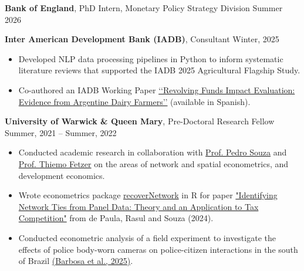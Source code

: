 \documentclass[letterpaper, 11pt]{article}
\begin{document}
\noindent
\textbf{Bank of England}, PhD Intern, Monetary Policy Strategy Division \hfill Summer 2026

\vspace{0.1cm}

\noindent
\textbf{Inter American Development Bank (IADB)},  Consultant \hfill Winter, 2025
\vspace{-0.2cm}
\begin{itemize}
	\item Developed NLP data processing pipelines in Python to inform systematic literature reviews that supported the IADB 2025 Agricultural Flagship Study.\vspace{-0.2cm}
	\item Co-authored an IADB Working Paper \href{https://publications.iadb.org/es/evaluacion-de-fondos-rotatorios-de-credito-evidencia-de-la-cadena-lechera-argentina}{\lq\lq Revolving Funds Impact Evaluation: Evidence from Argentine Dairy Farmers\rq\rq} (available in Spanish).
\end{itemize}

\vspace{0.1cm}

\noindent
\textbf{University of Warwick \& Queen Mary}, Pre-Doctoral Research Fellow \hfill Summer, 2021 -- Summer, 2022
\vspace{-0.2cm}
\begin{itemize}
	\item Conducted academic research in collaboration with \href{https://www.pedroclsouza.com/}{Prof. Pedro Souza} and \href{https://www.trfetzer.com/}{Prof. Thiemo Fetzer} on the areas of network and spatial econometrics, and development economics.\vspace{-0.2cm}
	\item Wrote econometrics package \href{https://github.com/pedroclsouza/recoverNetwork}{recoverNetwork} in R for paper \href{https://www.restud.com/identifying-network-ties-from-panel-data-theory-and-an-application-to-tax-competition/}{"Identifying Network Ties from Panel Data: Theory and an Application to Tax Competition"} from de Paula, Rasul and Souza (2024).\vspace{-0.2cm}
	\item Conducted econometric analysis of a field experiment to investigate the effects of police body-worn cameras on police-citizen interactions in the south of Brazil \href{https://doi.org/10.1162/rest.a.286}{(Barbosa et al., 2025)}.
\end{itemize}
\end{document}
